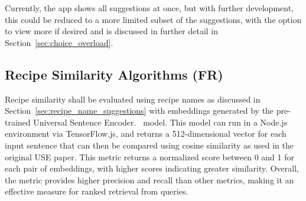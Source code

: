 Currently, the app shows all suggestions at once, but with further development, this could be
reduced to a more limited subset of the suggestions, with the option to view more if desired and is
discussed in further detail in Section~\ref{sec:choice_overload}.

\subsection{Recipe Similarity Algorithms (FR)}\label{sec:recipe_similarity}

Recipe similarity shall be evaluated using recipe names as discussed in Section~\ref{sec:recipe_name_suggestions}
with embeddings generated by the pre-trained Universal Sentence Encoder.~\cite{cer_universal_2018} model.
This model can run in a Node.js environment via TensorFlow.js, and returns a 512-dimensional vector
for each input sentence that can then be compared using cosine similarity as used in the original
USE paper. This metric returns a normalized score between 0 and 1 for each pair of embeddings, with
higher scores indicating greater similarity. Overall, the metric provides higher precision and recall
than other metrics, making it an effective measure for ranked retrieval from queries.~\cite{ihajeer_comparison_2012}
